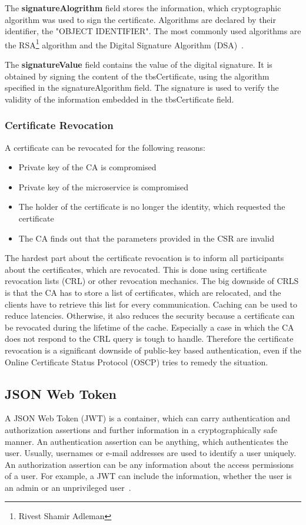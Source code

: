 The \textbf{signatureAlogrithm} field stores the information, which cryptographic algorithm was used to sign the certificate.
Algorithms are declared by their identifier, the "OBJECT IDENTIFIER".
The most commonly used algorithms are the RSA\footnote{Rivest Shamir Adleman} algorithm and the Digital Signature Algorithm (DSA)~\cite{x509rfc}.

The \textbf{signatureValue} field contains the value of the digital signature.
It is obtained by signing the content of the tbsCertificate, using the algorithm specified in the signatureAlgorithm field.
The signature is used to verify the validity of the information embedded in the tbsCertificate field.

\subsubsection{Certificate Revocation}
A certificate can be revocated for the following reasons: 
\begin{itemize}
    \item Private key of the CA is compromised
    \item Private key of the microservice is compromised
    \item The holder of the certificate is no longer the identity, which requested the certificate 
    \item The CA finds out that the parameters provided in the CSR are invalid
\end{itemize}
The hardest part about the certificate revocation is to inform all participants about the certificates, which are revocated.
This is done using certificate revocation lists (CRL) or other revocation mechanics.
The big downside of CRLS is that the CA has to store a list of certificates, which are relocated, and the clients have to retrieve this list for every communication.
Caching can be used to reduce latencies.
Otherwise, it also reduces the security because a certificate can be revocated during the lifetime of the cache.
Especially a case in which the CA does not respond to the CRL query is tough to handle.
Therefore the certificate revocation is a significant downside of public-key based authentication, even if the Online Certificate Status Protocol (OSCP) tries to remedy the situation\cite{dias2020microservices}.

\subsection{JSON Web Token}
A JSON Web Token (JWT) is a container, which can carry authentication and authorization assertions and further information in a cryptographically safe manner.
An authentication assertion can be anything, which authenticates the user.
Usually, usernames or e-mail addresses are used to identify a user uniquely.
An authorization assertion can be any information about the access permissions of a user.
For example, a JWT can include the information, whether the user is an admin or an unprivileged user~\cite{dias2020microservices}. 

